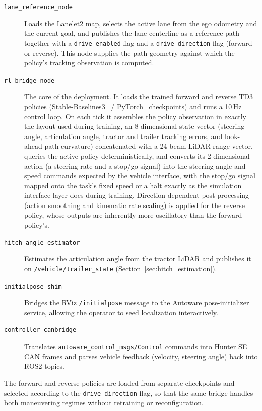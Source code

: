 \begin{description}
    \item[\texttt{lane\_reference\_node}] Loads the Lanelet2 map, selects the active lane from the ego odometry and the current goal, and publishes the lane centerline as a reference path together with a \texttt{drive\_enabled} flag and a \texttt{drive\_direction} flag (forward or reverse). This node supplies the path geometry against which the policy's tracking observation is computed.

    \item[\texttt{rl\_bridge\_node}] The core of the deployment. It loads the trained forward and reverse TD3 policies (Stable-Baselines3~\cite{raffin2021sb3} / PyTorch~\cite{paszke2019pytorch} checkpoints) and runs a 10\,Hz control loop. On each tick it assembles the policy observation in exactly the layout used during training, an 8-dimensional state vector (steering angle, articulation angle, tractor and trailer tracking errors, and look-ahead path curvature) concatenated with a 24-beam LiDAR range vector, queries the active policy deterministically, and converts its 2-dimensional action (a steering rate and a stop/go signal) into the steering-angle and speed commands expected by the vehicle interface, with the stop/go signal mapped onto the task's fixed speed or a halt exactly as the simulation interface layer does during training. Direction-dependent post-processing (action smoothing and kinematic rate scaling) is applied for the reverse policy, whose outputs are inherently more oscillatory than the forward policy's.

    \item[\texttt{hitch\_angle\_estimator}] Estimates the articulation angle from the tractor LiDAR and publishes it on \texttt{/vehicle/trailer\_state} (Section~\ref{sec:hitch_estimation}).

    \item[\texttt{initialpose\_shim}] Bridges the RViz \texttt{/initialpose} message to the Autoware pose-initializer service, allowing the operator to seed localization interactively.

    \item[\texttt{controller\_canbridge}] Translates \texttt{autoware\_\allowbreak control\_\allowbreak msgs/\allowbreak Control} commands into Hunter SE CAN frames and parses vehicle feedback (velocity, steering angle) back into ROS2 topics.
\end{description}

The forward and reverse policies are loaded from separate checkpoints and selected according to the \texttt{drive\_direction} flag, so that the same bridge handles both maneuvering regimes without retraining or reconfiguration.

